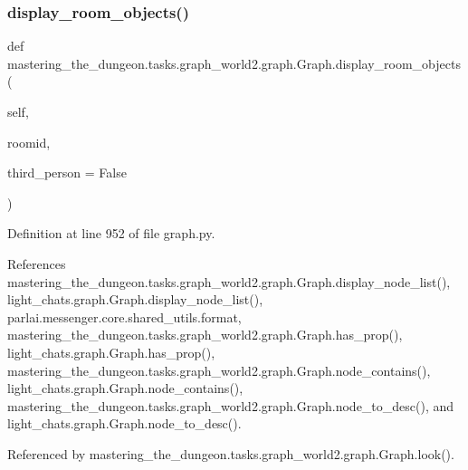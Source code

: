 \subsubsection{\texorpdfstring{display\+\_\+room\+\_\+objects()}{display\_room\_objects()}}
{\footnotesize\ttfamily def mastering\+\_\+the\+\_\+dungeon.\+tasks.\+graph\+\_\+world2.\+graph.\+Graph.\+display\+\_\+room\+\_\+objects (\begin{DoxyParamCaption}\item[{}]{self,  }\item[{}]{roomid,  }\item[{}]{third\+\_\+person = {\ttfamily False} }\end{DoxyParamCaption})}



Definition at line 952 of file graph.\+py.



References mastering\+\_\+the\+\_\+dungeon.\+tasks.\+graph\+\_\+world2.\+graph.\+Graph.\+display\+\_\+node\+\_\+list(), light\+\_\+chats.\+graph.\+Graph.\+display\+\_\+node\+\_\+list(), parlai.\+messenger.\+core.\+shared\+\_\+utils.\+format, mastering\+\_\+the\+\_\+dungeon.\+tasks.\+graph\+\_\+world2.\+graph.\+Graph.\+has\+\_\+prop(), light\+\_\+chats.\+graph.\+Graph.\+has\+\_\+prop(), mastering\+\_\+the\+\_\+dungeon.\+tasks.\+graph\+\_\+world2.\+graph.\+Graph.\+node\+\_\+contains(), light\+\_\+chats.\+graph.\+Graph.\+node\+\_\+contains(), mastering\+\_\+the\+\_\+dungeon.\+tasks.\+graph\+\_\+world2.\+graph.\+Graph.\+node\+\_\+to\+\_\+desc(), and light\+\_\+chats.\+graph.\+Graph.\+node\+\_\+to\+\_\+desc().



Referenced by mastering\+\_\+the\+\_\+dungeon.\+tasks.\+graph\+\_\+world2.\+graph.\+Graph.\+look().

